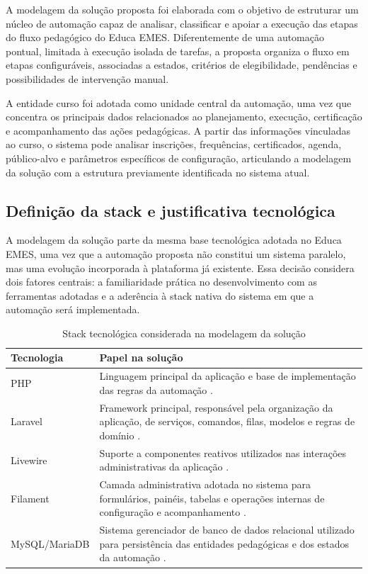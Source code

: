 A modelagem da solução proposta foi elaborada com o objetivo de
estruturar um núcleo de automação capaz de analisar, classificar e
apoiar a execução das etapas do fluxo pedagógico do Educa EMES.
Diferentemente de uma automação pontual, limitada à execução isolada de
tarefas, a proposta organiza o fluxo em etapas configuráveis,
associadas a estados, critérios de elegibilidade, pendências e
possibilidades de intervenção manual.

A entidade curso foi adotada como unidade central da automação, uma vez
que concentra os principais dados relacionados ao planejamento,
execução, certificação e acompanhamento das ações pedagógicas. A partir
das informações vinculadas ao curso, o sistema pode analisar
inscrições, frequências, certificados, agenda, público-alvo e
parâmetros específicos de configuração, articulando a modelagem da
solução com a estrutura previamente identificada no sistema atual.

\subsection{Definição da stack e justificativa tecnológica}
\label{sec:metod:modelagem:stack}

A modelagem da solução parte da mesma base tecnológica adotada no
Educa EMES, uma vez que a automação proposta não constitui um sistema
paralelo, mas uma evolução incorporada à plataforma já existente. Essa
decisão considera dois fatores centrais: a familiaridade prática no
desenvolvimento com as ferramentas adotadas e a aderência à stack
nativa do sistema em que a automação será implementada.

\begin{table}[H]
\centering
\caption{Stack tecnológica considerada na modelagem da solução}
\label{tab:stack-modelagem-automacao}
\begin{tabular}{p{3cm} p{10cm}}
\hline
\textbf{Tecnologia} & \textbf{Papel na solução} \\
\hline
PHP & Linguagem principal da aplicação e base de implementação das regras da automação \cite{PHP2024}. \\
\hline
Laravel & Framework principal, responsável pela organização da aplicação, de serviços, comandos, filas, modelos e regras de domínio \cite{Laravel2024,LaravelCommands2024,LaravelQueues2024}. \\
\hline
Livewire & Suporte a componentes reativos utilizados nas interações administrativas da aplicação \cite{Livewire2024}. \\
\hline
Filament & Camada administrativa adotada no sistema para formulários, painéis, tabelas e operações internas de configuração e acompanhamento \cite{Filament2024,FilamentAdminPanel2024}. \\
\hline
MySQL/MariaDB & Sistema gerenciador de banco de dados relacional utilizado para persistência das entidades pedagógicas e dos estados da automação \cite{MySQL2024}. \\
\hline
\end{tabular}
\end{table}

